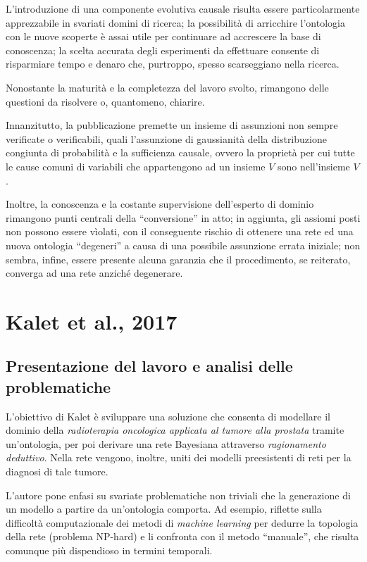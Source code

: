 L'introduzione di una componente evolutiva causale risulta essere particolarmente apprezzabile in svariati domini di ricerca; la possibilità di arricchire l'ontologia con le nuove scoperte è assai utile per continuare ad accrescere la base di conoscenza; la scelta accurata degli esperimenti da effettuare consente di risparmiare tempo e denaro che, purtroppo, spesso scarseggiano nella ricerca.

Nonostante la maturità e la completezza del lavoro svolto, rimangono delle questioni da risolvere o, quantomeno, chiarire.
 
Innanzitutto, la pubblicazione premette un insieme di assunzioni non sempre verificate o verificabili, quali l'assunzione di gaussianità della distribuzione congiunta di probabilità e la sufficienza causale, ovvero la proprietà per cui tutte le cause comuni di variabili che appartengono ad un insieme $V$ sono nell’insieme $V$. 

Inoltre, la conoscenza e la costante supervisione dell'esperto di dominio rimangono punti centrali della ``conversione'' in atto; in aggiunta, gli assiomi posti non possono essere vìolati, con il conseguente rischio di ottenere una rete ed una nuova ontologia ``degeneri'' a causa di una possibile assunzione errata iniziale; non sembra, infine, essere presente alcuna garanzia che il procedimento, se reiterato, converga ad una rete anziché degenerare.


\section{Kalet et al., 2017}
\subsection{Presentazione del lavoro e analisi delle problematiche}
L'obiettivo di Kalet\cite{kalet2017} è sviluppare una soluzione che consenta di modellare il dominio della \textit{radioterapia oncologica applicata al tumore alla prostata} tramite un'ontologia, per poi derivare una rete Bayesiana attraverso \textit{ragionamento deduttivo}. Nella rete vengono, inoltre, uniti dei modelli preesistenti di reti per la diagnosi di tale tumore.

L'autore pone enfasi su svariate problematiche non triviali che la generazione di un modello a partire da un'ontologia comporta. Ad esempio, riflette sulla difficoltà computazionale dei metodi di \textit{machine learning} per dedurre la topologia della rete (problema NP-hard\cite{kalet2017}) e li confronta con il metodo ``manuale'', che risulta comunque più dispendioso in termini temporali.

